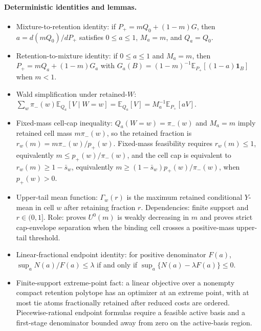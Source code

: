 \documentclass[11pt]{article}
\newcommand{\E}{\mathbb{E}}
\newcommand{\one}{\mathbf{1}}
\theoremstyle{definition}
\theoremstyle{plain}
\theoremstyle{remark}
\begin{document}
\paragraph{Deterministic identities and lemmas.}
\begin{itemize}[leftmargin=*]
  \item Mixture-to-retention identity:
  if \(P_+=mQ_0+(1-m)G\), then \(a=d(mQ_0)/dP_+\) satisfies \(0\le a\le1\),
  \(M_a=m\), and \(Q_a=Q_0\).
  \item Retention-to-mixture identity:
  if \(0\le a\le1\) and \(M_a=m\), then
  \(P_+=mQ_a+(1-m)G_a\) with
  \(G_a(B)=(1-m)^{-1}\E_{P_+}[(1-a)\one_B]\) when \(m<1\).
  \item Wald simplification under retained-\(W\):
  \(\sum_w\pi_-(w)\E_{Q_a}[V\mid W=w]=\E_{Q_a}[V]=M_a^{-1}\E_{P_+}[aV]\).
  \item Fixed-mass cell-cap inequality:
  \(Q_a(W=w)=\pi_-(w)\) and \(M_a=m\) imply retained cell mass
  \(m\pi_-(w)\), so the retained fraction is
  \(r_w(m)=m\pi_-(w)/p_+(w)\).  Fixed-mass feasibility requires
  \(r_w(m)\le1\), equivalently \(m\le p_+(w)/\pi_-(w)\), and the cell cap is
  equivalent to \(r_w(m)\ge1-\bar s_w\), equivalently
  \(m\ge(1-\bar s_w)p_+(w)/\pi_-(w)\), when \(p_+(w)>0\).
  \item Upper-tail mean function:
  \(\Gamma_w(r)\) is the maximum retained conditional \(Y\)-mean in cell \(w\) after
  retaining fraction \(r\).  Dependencies: finite support and \(r\in(0,1]\).  Role:
  proves \(U^0(m)\) is weakly decreasing in \(m\) and proves strict cap-envelope
  separation when the binding cell crosses a positive-mass upper-tail threshold.
  \item Linear-fractional endpoint identity:
  for positive denominator \(F(a)\), \(\sup_a N(a)/F(a)\le\lambda\) if and only if
  \(\sup_a\{N(a)-\lambda F(a)\}\le0\).
  \item Finite-support extreme-point fact:
  a linear objective over a nonempty compact retention polytope has an optimizer at an
  extreme point, with at most tie atoms fractionally retained after reduced costs are
  ordered.  Piecewise-rational endpoint formulas require a feasible active basis and a
  first-stage denominator bounded away from zero on the active-basis region.
\end{itemize}
\end{document}
